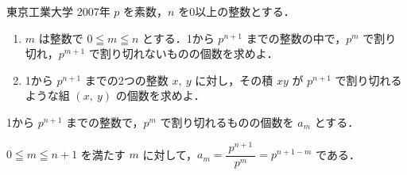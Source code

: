 \documentclass[a4paper]{ltjsarticle}
\begin{document}

\begin{itembox}[l]{東京工業大学 2007年}
    $p$ を素数，$n$ を0以上の整数とする．

    \begin{enumerate}[label=(\arabic*)]
        \item $m$ は整数で $0\leqq m\leqq n$ とする．1から $p^{n+1}$ までの整数の中で，$p^m$ で割り切れ，$p^{m+1}$ で割り切れないものの個数を求めよ．

        \item 1から $p^{n+1}$ までの2つの整数 $x,\ y$ に対し，その積 $xy$ が $p^{n+1}$ で割り切れるような組 $(x,\ y)$ の個数を求めよ．
    \end{enumerate}
\end{itembox}

1から $p^{n+1}$ までの整数で，$p^m$ で割り切れるものの個数を $a_m$ とする．

$0\leqq m\leqq n+1$ を満たす $m$ に対して，$a_m=\dfrac{\ p^{n+1}\ }{p^m}=p^{n+1-m}$ である．
\end{document}
